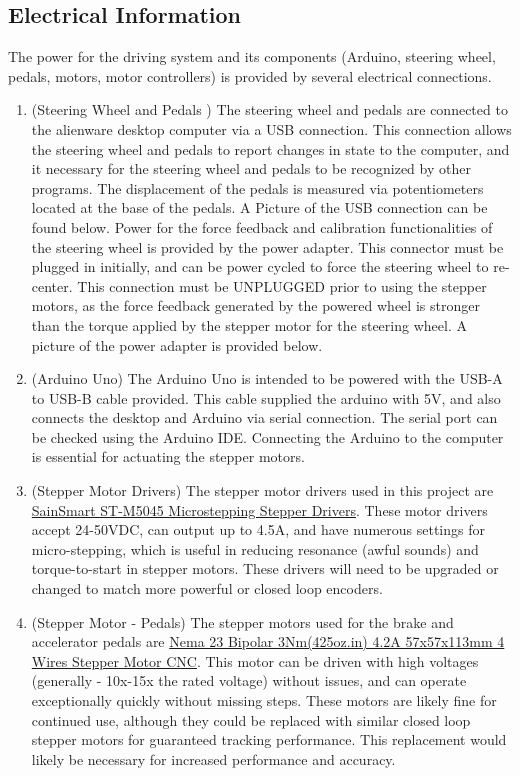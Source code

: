 \documentclass[12pt,oneside,letterpaper]{article}
\begin{document}
\subsection{Electrical Information}
The power for the driving system and its components (Arduino, steering wheel, pedals, motors, motor controllers) is provided by several electrical connections.
\begin{enumerate}

\item(Steering Wheel and Pedals ) The steering wheel and pedals are connected to the alienware desktop computer via a USB connection. This connection allows the steering wheel and pedals to report changes in state to the computer, and it necessary for the steering wheel and pedals to be recognized by other programs. The displacement of the pedals is measured via potentiometers located at the base of the pedals. A Picture of the USB connection can be found below. Power for the force feedback and calibration functionalities of the steering wheel is provided by the power adapter. This connector must be plugged in initially, and can be power cycled to force the steering wheel to re-center. This connection must be UNPLUGGED prior to using the stepper motors, as the force feedback generated by the powered wheel is stronger than the torque applied by the stepper motor for the steering wheel. A picture of the power adapter is provided below.

\item(Arduino Uno) The Arduino Uno is intended to be powered with the USB-A to USB-B cable provided. This cable supplied the arduino with 5V, and also connects the desktop and Arduino via serial connection. The serial port can be checked using the Arduino IDE. Connecting the Arduino to the computer is essential for actuating the stepper motors.

\item(Stepper Motor Drivers) The stepper motor drivers used in this project are \href{https://www.amazon.com/SainSmart-Micro-Stepping-Stepper-Driver-ST-M5045/dp/B00DFSF9GE/ref=cm_cr_arp_d_product_top?ie=UTF8}{SainSmart ST-M5045 Microstepping Stepper Drivers}. These motor drivers accept 24-50VDC, can output up to 4.5A, and have numerous settings for micro-stepping, which is useful in reducing resonance (awful sounds) and torque-to-start in stepper motors. These drivers will need to be upgraded or changed to match more powerful or closed loop encoders.

\item(Stepper Motor - Pedals) The stepper motors used for the brake and accelerator pedals are \href{https://www.omc-stepperonline.com/nema-23-bipolar-3nm-425oz-in-4-2a-57x57x114mm-4-wires-stepper-motor-cnc-23hs45-4204s}{Nema 23 Bipolar 3Nm(425oz.in) 4.2A 57x57x113mm 4 Wires Stepper Motor CNC}. This motor can be driven with high voltages (generally - 10x-15x the rated voltage) without issues, and can operate exceptionally quickly without missing steps. These motors are likely fine for continued use, although they could be replaced with similar closed loop stepper motors for guaranteed tracking performance. This replacement would likely be necessary for increased performance and accuracy.


\end{enumerate}
\end{document}
